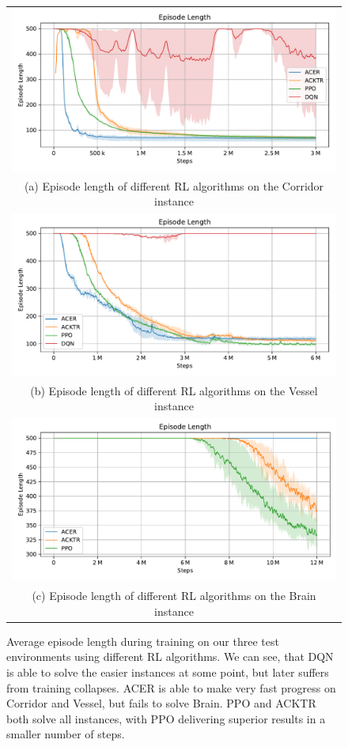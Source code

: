 \begin{figure}[htp]
    \begin{center}
        \begin{tabular}{c}
            \includegraphics[clip, width=0.75\columnwidth]{figures/evaluation/algorithms/maze0318_episode_length.pdf} \\
            {\small (a) Episode length of different RL algorithms on the Corridor instance} \\
            \includegraphics[clip, width=0.75\columnwidth]{figures/evaluation/algorithms/vesselmaze02_episode_length.pdf} \\
            {\small (b) Episode length of different RL algorithms on the Vessel instance} \\
            \includegraphics[clip, width=0.75\columnwidth]{figures/evaluation/algorithms/maze0122_episode_length.pdf} \\
            {\small (c) Episode length of different RL algorithms on the Brain instance} \\
        \end{tabular}
    \end{center}
    \caption[Episode Length During Training using Different RL Algorithms]{Average episode length during training on our three test environments using different RL algorithms. We can see, that DQN is able to solve the easier instances at some point, but later suffers from training collapses. ACER is able to make very fast progress on Corridor and Vessel, but fails to solve Brain. PPO and ACKTR both solve all instances, with PPO delivering superior results in a smaller number of steps.} \label{fig:Algorithm/Ep_Length}
\end{figure}


